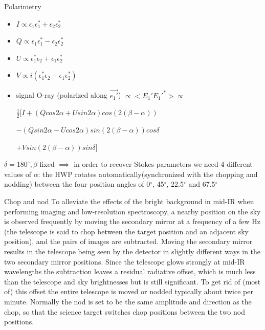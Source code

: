 \documentclass{beamer}
\begin{document}
\begin{frame}{Polarimetry}

\begin{itemize}
\item $I \propto \epsilon_1 \epsilon_1^* + \epsilon_2 \epsilon_2^*$
\item $Q \propto \epsilon_1 \epsilon_1^* - \epsilon_2 \epsilon_2^*$
\item $U \propto \epsilon_1^* \epsilon_2 + \epsilon_1 \epsilon_2^*$
\item $V \propto i(\epsilon_1^* \epsilon_2 - \epsilon_1 \epsilon_2^*)$
\item signal O-ray (polarized along $\vec{e_1'}$) $ \propto <E_1' E_1'^*> \propto$  

$\frac{1}{2}[I + (Q cos 2\alpha + U sin 2 \alpha) cos(2(\beta - \alpha)) $

$- (Q sin 2\alpha - U cos 2 \alpha) sin(2(\beta - \alpha)) cos \delta $

$+ V  sin(2(\beta - \alpha)) sin \delta ]$

\end{itemize}

$\delta = 180^{\circ},\beta$ fixed $\implies$ in order to recover Stokes parameters we need 4 different values of $\alpha$:
the HWP rotates automatically(synchronized with the chopping and nodding) between the four position angles of 0$^{\circ}$, 45$^{\circ}$, 22.5$^{\circ}$ and 67.5$^{\circ}$
\end{frame}

\begin{frame}{Chop and nod}
To alleviate the effects of the bright background in mid-IR when performing imaging and low-resolution spectroscopy, 
a nearby position on the sky is observed frequently by moving the secondary mirror at a frequency of a few Hz 
(the telescope is said to chop between the target position and an adjacent sky position), 
and the pairs of images are subtracted. 
Moving the secondary mirror results in the telescope being seen by the detector in slightly 
different ways in the two secondary mirror positions. 
Since the telescope glows strongly at mid-IR wavelengths 
the subtraction leaves a residual radiative offset, 
which is much less than the telescope and sky brightnesses but is still significant. 
To get rid of (most of) this offset the entire telescope is moved or 
nodded typically about twice per minute. 
Normally the nod is set to be the same amplitude and direction as the chop, 
so that the science target switches chop positions between the two nod positions.

\end{frame}
\end{document}
